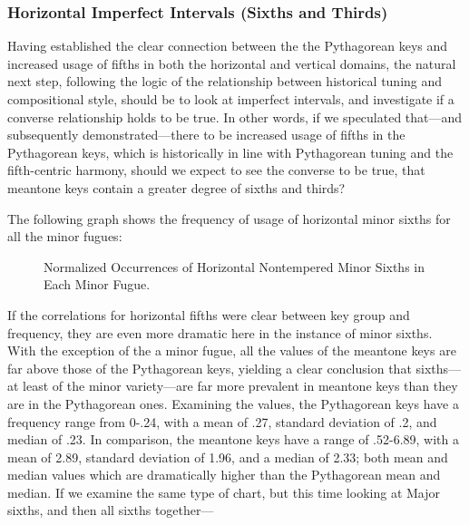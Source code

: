     \subsubsection{Horizontal Imperfect Intervals (Sixths and
Thirds)}\label{horizontal-imperfect-intervals-sixths-and-thirds}

Having established the clear connection between the the Pythagorean keys
and increased usage of fifths in both the horizontal and vertical
domains, the natural next step, following the logic of the relationship
between historical tuning and compositional style, should be to look at
imperfect intervals, and investigate if a converse relationship holds to
be true. In other words, if we speculated that---and subsequently
demonstrated---there to be increased usage of fifths in the
Pythagorean keys, which is historically in line with Pythagorean tuning
and the fifth-centric harmony, should we expect to see the converse to
be true, that meantone keys contain a greater degree of sixths and
thirds?

The following graph shows the frequency of usage of horizontal minor
sixths for all the minor fugues:




\begin{figure}[H]
    \begin{center}
    \caption{Normalized Occurrences of Horizontal Nontempered Minor Sixths in Each Minor Fugue. }
    \end{center}
\end{figure}
    
    If the correlations for horizontal fifths were clear between key group
and frequency, they are even more dramatic here in the instance of minor
sixths. With the exception of the a minor fugue, all the values of the
meantone keys are far above those of the Pythagorean keys, yielding a
clear conclusion that sixths---at least of the minor
variety---are far more prevalent in meantone keys than they are in
the Pythagorean ones. Examining the values, the Pythagorean keys have a
frequency range from 0-.24, with a mean of .27, standard deviation of
.2, and median of .23. In comparison, the meantone keys have a range of
.52-6.89, with a mean of 2.89, standard deviation of 1.96, and a median
of 2.33; both mean and median values which are dramatically higher than
the Pythagorean mean and median. If we examine the same type of chart,
but this time looking at Major sixths, and then all sixths
together---



